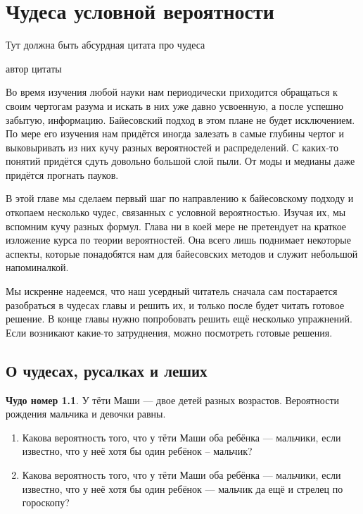 \documentclass[12pt, a4paper, oneside]{extreport}
\theoremstyle{plain}              %
\theoremstyle{definition}         %
\newtheorem{chudo}{Чудо номер}   %
\begin{document}
\chapter{ Чудеса условной вероятности }

\epigraph{Тут должна быть абсурдная цитата про чудеса}{автор цитаты }



Во время изучения любой науки нам периодически приходится обращаться к своим чертогам разума и искать в них уже давно усвоенную, а после успешно забытую, информацию. Байесовский подход в этом плане не будет исключением. По мере его изучения нам придётся иногда залезать в самые глубины чертог и выковыривать из них кучу разных вероятностей и распределений. С каких-то понятий придётся сдуть довольно большой слой пыли. От моды и медианы даже придётся прогнать пауков. 

В этой главе мы сделаем первый шаг по направлению к байесовскому подходу и откопаем несколько чудес, связанных с условной вероятностью.  Изучая их, мы вспомним кучу разных формул. Глава ни в коей мере не претендует на краткое изложение курса по теории вероятностей. Она всего лишь поднимает некоторые аспекты, которые понадобятся нам для байесовских методов и служит небольшой напоминалкой. 

Мы искренне надеемся, что наш усердный читатель сначала сам постарается разобраться в чудесах главы и решить их, и только после будет читать готовое решение.  В конце главы нужно попробовать решить ещё несколько упражнений. Если возникают какие-то затруднения, можно посмотреть готовые решения. 

\section{О чудесах, русалках и леших}

\begin{chudo}
У тёти Маши --- двое детей разных возрастов. Вероятности рождения мальчика и девочки равны.

\begin{enumerate}
\item Какова вероятность того, что у тёти Маши оба ребёнка --- мальчики, если известно, что у неё хотя бы один ребёнок -- мальчик?
\item Какова вероятность того, что у тёти Маши оба ребёнка --- мальчики, если известно, что у неё хотя бы один ребёнок --- мальчик да ещё и стрелец по гороскопу?
\end{enumerate}
\end{chudo}
\end{document}
